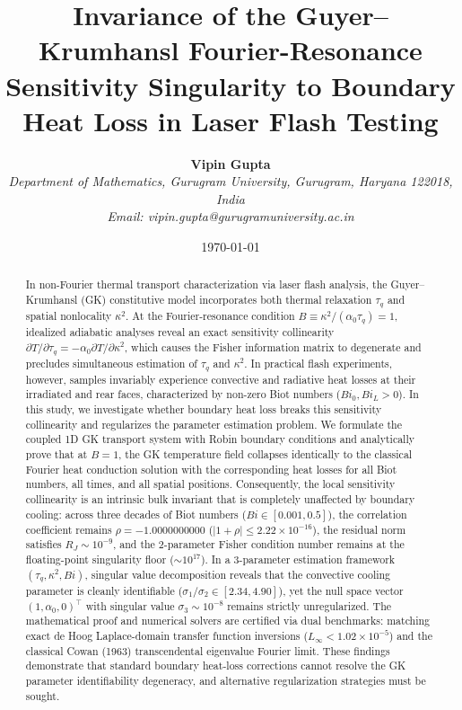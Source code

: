 \documentclass[review,12pt]{article}
\title{\textbf{Invariance of the Guyer--Krumhansl Fourier-Resonance Sensitivity Singularity to Boundary Heat Loss in Laser Flash Testing}}
\author{
    \textbf{Vipin Gupta} \\
    \textit{Department of Mathematics, Gurugram University, Gurugram, Haryana 122018, India} \\
    \textit{Email: vipin.gupta@gurugramuniversity.ac.in}
}
\date{\today}
\begin{document}
\maketitle

\begin{abstract}
In non-Fourier thermal transport characterization via laser flash analysis, the Guyer--Krumhansl (GK) constitutive model incorporates both thermal relaxation $\tau_q$ and spatial nonlocality $\kappa^2$. At the Fourier-resonance condition $B \equiv \kappa^2 / (\alpha_0 \tau_q) = 1$, idealized adiabatic analyses reveal an exact sensitivity collinearity $\partial T / \partial \tau_q = -\alpha_0 \partial T / \partial \kappa^2$, which causes the Fisher information matrix to degenerate and precludes simultaneous estimation of $\tau_q$ and $\kappa^2$. In practical flash experiments, however, samples invariably experience convective and radiative heat losses at their irradiated and rear faces, characterized by non-zero Biot numbers ($Bi_0, Bi_L > 0$). In this study, we investigate whether boundary heat loss breaks this sensitivity collinearity and regularizes the parameter estimation problem. We formulate the coupled 1D GK transport system with Robin boundary conditions and analytically prove that at $B = 1$, the GK temperature field collapses identically to the classical Fourier heat conduction solution with the corresponding heat losses for all Biot numbers, all times, and all spatial positions. Consequently, the local sensitivity collinearity is an intrinsic bulk invariant that is completely unaffected by boundary cooling: across three decades of Biot numbers ($Bi \in [0.001, 0.5]$), the correlation coefficient remains $\rho = -1.0000000000$ ($|1+\rho| \le 2.22 \times 10^{-16}$), the residual norm satisfies $R_J \sim 10^{-9}$, and the 2-parameter Fisher condition number remains at the floating-point singularity floor ($\sim 10^{17}$). In a 3-parameter estimation framework $(\tau_q, \kappa^2, Bi)$, singular value decomposition reveals that the convective cooling parameter is cleanly identifiable ($\sigma_1 / \sigma_2 \in [2.34, 4.90]$), yet the null space vector $(1, \alpha_0, 0)^\top$ with singular value $\sigma_3 \sim 10^{-8}$ remains strictly unregularized. The mathematical proof and numerical solvers are certified via dual benchmarks: matching exact de Hoog Laplace-domain transfer function inversions ($L_\infty < 1.02 \times 10^{-5}$) and the classical Cowan (1963) transcendental eigenvalue Fourier limit. These findings demonstrate that standard boundary heat-loss corrections cannot resolve the GK parameter identifiability degeneracy, and alternative regularization strategies must be sought.
\end{abstract}
\end{document}
